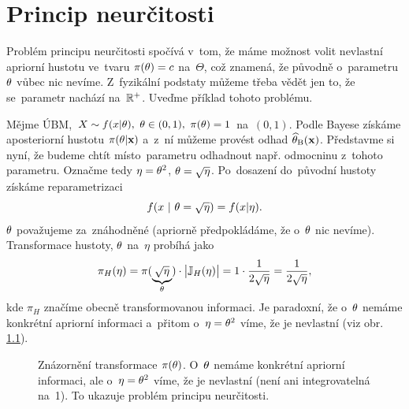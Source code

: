 \chapter{Princip neurčitosti}

Problém principu neurčitosti spočívá v~tom, že máme možnost volit nevlastní apriorní hustotu ve~tvaru $\pi(\theta)=c$ na~$\Theta$, což znamená, že původně o~parametru $\theta$ vůbec nic nevíme. Z~fyzikální podstaty můžeme třeba vědět jen to, že se~parametr nachází na~$\mathbb{R}^+$. Uveďme příklad tohoto problému.
\begin{example}
	Mějme ÚBM, $X\sim f(x|\theta),~\theta\in(0,1),~\pi(\theta)=1$ na~$(0,1)$. Podle Bayese získáme aposteriorní hustotu $\pi(\theta|\textbf{x})$ a~z~ní můžeme provést odhad $\widehat{\theta}_\mathrm{B}(\textbf{x})$. Představme si nyní, že budeme chtít místo~parametru odhadnout např. odmocninu z~tohoto parametru. Označme tedy $\eta=\theta^2$, $\theta=\sqrt{\eta}$. Po~dosazení do~původní hustoty získáme reparametrizaci $$f(x~|~\theta=\sqrt{\eta})=f(x|\eta).$$ $\theta$ považujeme za~znáhodněné (apriorně předpokládáme, že o~$\theta$ nic nevíme). Transformace hustoty, $\theta$ na~$\eta$ probíhá jako $$\pi_H(\eta)=\pi(\underbrace{\sqrt{\eta}}_{\theta})\cdot\big|\mathbb{J}_H(\eta)\big|=1\cdot\frac{1}{2\sqrt{\eta}}=\frac{1}{2\sqrt{\eta}},$$
	kde $\pi_H$ značíme obecně transformovanou informaci. Je paradoxní, že o~$\theta$ nemáme konkrétní apriorní informaci a~přitom o~$\eta=\theta^2$ víme, že je nevlastní (viz obr. \ref{fig:p71}).
\begin{figure}[h]
	\centering
	\caption{Znázornění transformace $\pi(\theta)$. O~$\theta$ nemáme konkrétní apriorní informaci, ale o~$\eta=\theta^2$ víme, že je nevlastní (není ani integrovatelná na~1). To ukazuje problém principu neurčitosti.}
	\label{fig:p71}
\end{figure}

\end{example}
